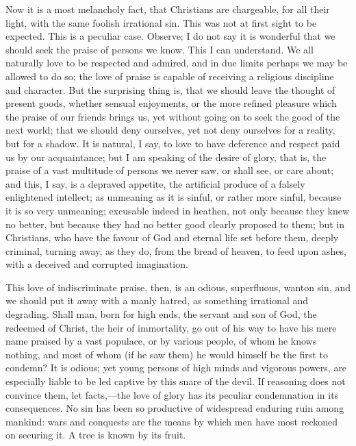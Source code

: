 Now it is a most melancholy fact, that Christians are chargeable,
for all their light, with the same foolish irrational sin. This was
not at first sight to be expected. This is a peculiar case. Observe; I
do not say it is wonderful that we should seek the praise of persons
we know. This I can understand. We all naturally love to be respected
and admired, and in due limits perhaps we may be allowed to do so; the
love of praise is capable of receiving a religious discipline and
character. But the surprising thing is, that we should leave the
thought of present goods, whether sensual enjoyments, or the more
refined pleasure which the praise of our friends brings us, yet
without going on to seek the good of the next world; that we should
deny ourselves, yet not deny ourselves for a reality, but for a
shadow. It is natural, I say, to love to have deference and respect
paid us by our acquaintance; but I am speaking of the desire of glory,
that is, the praise of a vast multitude of persons we never saw, or
shall see, or care about; and this, I say, is a depraved appetite, the
artificial produce of a falsely enlightened intellect; as unmeaning as
it is sinful, or rather more sinful, because it is so very unmeaning;
excusable indeed in heathen, not only because they knew no better, but
because they had no better good clearly proposed to them; but in
Christians, who have the favour of God and eternal life set before
them, deeply criminal, turning away, as they do, from the bread of
heaven, to feed upon ashes, with a deceived and corrupted imagination.

This love of indiscriminate praise, then, is an odious,
superfluous, wanton sin, and we should put it away with a manly
hatred, as something irrational and degrading. Shall man, born for
high ends, the servant and son of God, the redeemed of Christ, the
heir of immortality, go out of his way to have his mere name praised
by a vast populace, or by various people, of whom he knows nothing,
and most of whom (if he saw them) he would himself be the first to
condemn? It is odious; yet young persons of high minds and vigorous
powers, are especially liable to be led captive by this snare of the
devil. If reasoning does not convince them, let facts,—the love of
glory has its peculiar condemnation in its consequences. No sin has
been so productive of widespread enduring ruin among mankind: wars and
conquests are the means by which men have most reckoned on securing
it. A tree is known by its fruit.

